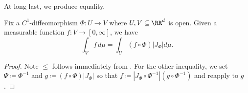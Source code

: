 \documentclass[../notes.tex]{subfiles}
\begin{document}
At long last, we produce equality.
\begin{lemma}
	Fix a $C^1$-diffeomorphism $\Phi\colon U\to V$ where $U,V\subseteq\RR^d$ is open. Given a measurable function $f\colon V\to[0,\infty]$, we have
	\[\int_Vf\,d\mu=\int_U(f\circ\Phi)\left|J_\Phi\right|d\mu.\]
\end{lemma}
\begin{proof}
	Note $\le$ follows immediately from . For the other inequality, we set $\Psi\coloneqq\Phi^{-1}$ and $g\coloneqq (f\circ\Phi)\left|J_\Phi\right|$ so that $f\coloneqq\left|J_\Phi\circ\Phi^{-1}\right|\left(g\circ\Phi^{-1}\right)$ and reapply  to $g$.
\end{proof}
\end{document}
